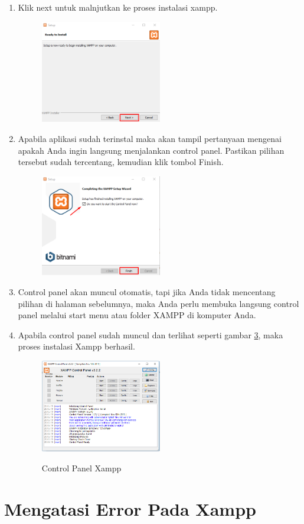 \begin{enumerate}
	\item Klik next untuk malnjutkan ke proses instalasi xampp.
		\begin{figure}[!htbp]
    		\centering
    		\includegraphics[width=0.5\textwidth]{figures/Xampp7.png}
    		\label{Xampp7}
		\end{figure}
		
	\item Apabila aplikasi sudah terinstal maka akan tampil pertanyaan mengenai apakah Anda ingin langsung menjalankan control panel. Pastikan pilihan tersebut sudah tercentang, kemudian klik tombol Finish.
		\begin{figure}[!htbp]
    		\centering
    		\includegraphics[width=0.5\textwidth]{figures/Xampp8.png}
    		\label{Xampp8}
		\end{figure}
		
	\item Control panel akan muncul otomatis, tapi jika Anda tidak mencentang pilihan di halaman sebelumnya, maka Anda perlu membuka langsung control panel melalui start menu atau folder XAMPP di komputer Anda.
	
	\item Apabila control panel sudah muncul dan terlihat seperti gambar \ref{Xampp9}, maka proses instalasi Xampp berhasil.
		\begin{figure}[!htbp]
    		\centering
    		\caption{Control Panel Xampp}
    		\includegraphics[width=0.5\textwidth]{figures/Xampp9.PNG}
    		\label{Xampp9}
		\end{figure}
\end{enumerate}

\section{Mengatasi Error Pada Xampp}
